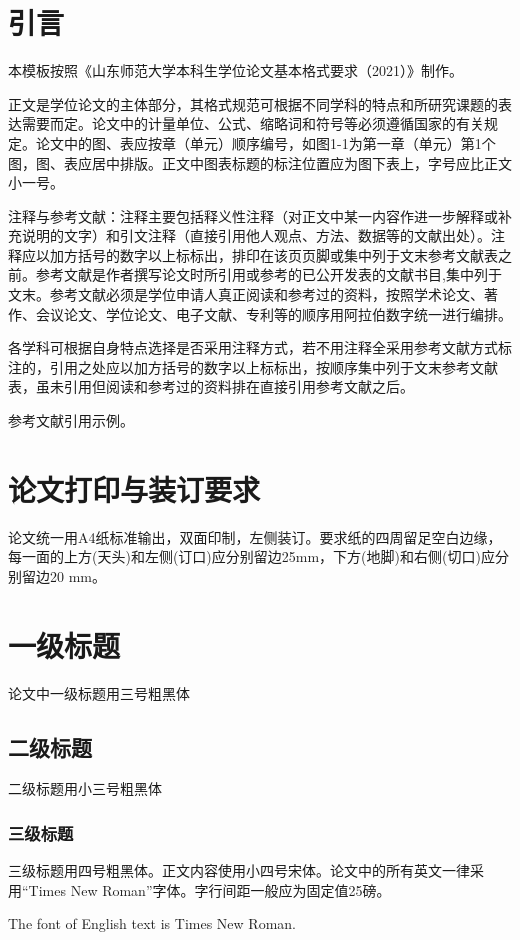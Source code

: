 \section{引言}
	本模板按照《山东师范大学本科生学位论文基本格式要求（2021）》制作。
	
	正文是学位论文的主体部分，其格式规范可根据不同学科的特点和所研究课题的表达需要而定。论文中的计量单位、公式、缩略词和符号等必须遵循国家的有关规定。论文中的图、表应按章（单元）顺序编号，如图1-1为第一章（单元）第1个图，图、表应居中排版。正文中图表标题的标注位置应为图下表上，字号应比正文小一号。
	
	注释与参考文献：注释主要包括释义性注释（对正文中某一内容作进一步解释或补充说明的文字）和引文注释（直接引用他人观点、方法、数据等的文献出处）。注释应以加方括号的数字以上标标出，排印在该页页脚或集中列于文末参考文献表之前。参考文献是作者撰写论文时所引用或参考的已公开发表的文献书目,集中列于文末。参考文献必须是学位申请人真正阅读和参考过的资料，按照学术论文、著作、会议论文、学位论文、电子文献、专利等的顺序用阿拉伯数字统一进行编排。
	
	各学科可根据自身特点选择是否采用注释方式，若不用注释全采用参考文献方式标注的，引用之处应以加方括号的数字以上标标出，按顺序集中列于文末参考文献表，虽未引用但阅读和参考过的资料排在直接引用参考文献之后。
	
	参考文献引用示例。
	
\section{论文打印与装订要求}
	论文统一用A4纸标准输出，双面印制，左侧装订。要求纸的四周留足空白边缘，每一面的上方(天头)和左侧(订口)应分别留边25mm，下方(地脚)和右侧(切口)应分别留边20 mm。

\section{一级标题}
	论文中一级标题用三号粗黑体
\subsection{二级标题}
	二级标题用小三号粗黑体
\subsubsection{三级标题}
	三级标题用四号粗黑体。正文内容使用小四号宋体。论文中的所有英文一律采用“Times New Roman”字体。字行间距一般应为固定值25磅。

	The font of English text is Times New Roman. 


